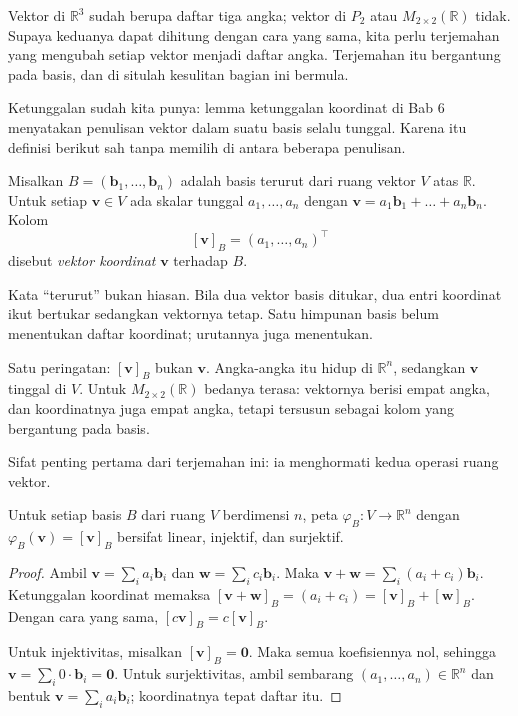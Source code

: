 Vektor di $\mathbb{R}^{3}$ sudah berupa daftar tiga angka; vektor di $P_{2}$ atau
$M_{2\times2}(\mathbb{R})$ tidak. Supaya keduanya dapat dihitung dengan cara yang sama, kita
perlu terjemahan yang mengubah setiap vektor menjadi daftar angka. Terjemahan itu bergantung
pada basis, dan di situlah kesulitan bagian ini bermula.

Ketunggalan sudah kita punya: lemma ketunggalan koordinat di Bab 6 menyatakan penulisan
vektor dalam suatu basis selalu tunggal. Karena itu definisi berikut sah tanpa memilih di
antara beberapa penulisan.


\begin{definisi}
Misalkan $B=(\mathbf{b}_{1},\dots,\mathbf{b}_{n})$ adalah basis terurut dari ruang vektor
$V$
atas $\mathbb{R}$. Untuk setiap $\mathbf{v}\in V$ ada skalar tunggal $a_{1},\dots,a_{n}$
dengan $\mathbf{v}=a_{1}\mathbf{b}_{1}+\dots+a_{n}\mathbf{b}_{n}$. Kolom
\[
  [\mathbf{v}]_{B}=(a_{1},\dots,a_{n})^{\top}
\]
disebut \emph{vektor koordinat} $\mathbf{v}$ terhadap $B$.
\end{definisi}

Kata ``terurut'' bukan hiasan. Bila dua vektor basis ditukar, dua entri koordinat ikut
bertukar sedangkan vektornya tetap. Satu himpunan basis belum menentukan daftar koordinat;
urutannya juga menentukan.

Satu peringatan: $[\mathbf{v}]_{B}$ bukan $\mathbf{v}$. Angka-angka itu hidup di
$\mathbb{R}^{n}$, sedangkan $\mathbf{v}$ tinggal di $V$. Untuk $M_{2\times2}(\mathbb{R})$
bedanya terasa: vektornya berisi empat angka, dan koordinatnya juga empat angka, tetapi
tersusun sebagai kolom yang bergantung pada basis.

Sifat penting pertama dari terjemahan ini: ia menghormati kedua operasi ruang vektor.

\begin{proposisi}
Untuk setiap basis $B$ dari ruang $V$ berdimensi $n$, peta
$\varphi_{B}\colon V\to\mathbb{R}^{n}$ dengan $\varphi_{B}(\mathbf{v})=[\mathbf{v}]_{B}$
bersifat linear, injektif, dan surjektif.
\end{proposisi}

\begin{proof}
Ambil $\mathbf{v}=\sum_{i}a_{i}\mathbf{b}_{i}$ dan $\mathbf{w}=\sum_{i}c_{i}\mathbf{b}_{i}$.
Maka $\mathbf{v}+\mathbf{w}=\sum_{i}(a_{i}+c_{i})\mathbf{b}_{i}$. Ketunggalan koordinat
memaksa $[\mathbf{v}+\mathbf{w}]_{B}=(a_{i}+c_{i})=[\mathbf{v}]_{B}+[\mathbf{w}]_{B}$.
Dengan cara yang sama, $[c\mathbf{v}]_{B}=c[\mathbf{v}]_{B}$.

Untuk injektivitas, misalkan $[\mathbf{v}]_{B}=\mathbf{0}$. Maka semua koefisiennya nol,
sehingga $\mathbf{v}=\sum_{i}0\cdot\mathbf{b}_{i}=\mathbf{0}$. Untuk surjektivitas, ambil
sembarang $(a_{1},\dots,a_{n})\in\mathbb{R}^{n}$ dan bentuk
$\mathbf{v}=\sum_{i}a_{i}\mathbf{b}_{i}$; koordinatnya tepat daftar itu.
\end{proof}

